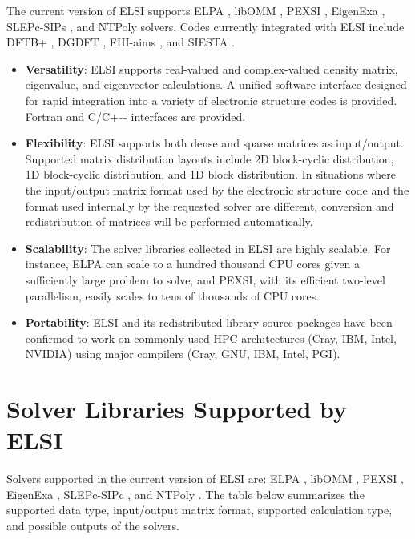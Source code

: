 \documentclass{report}
\begin{document}
The current version of ELSI supports ELPA \cite{elpa_auckenthaler_2011,elpa_marek_2014}, libOMM \cite{libomm_corsetti_2014}, PEXSI \cite{pexsi_lin_2009,pexsi_lin_2013}, EigenExa \cite{eigenexa_imamura_2011,eigenexa_fukaya_2015}, SLEPc-SIPs \cite{slepc_hernandez_2005,sips_keceli_2016}, and NTPoly \cite{ntpoly_dawson_2018} solvers. Codes currently integrated with ELSI include DFTB+ \cite{dftb+_aradi_2007}, DGDFT \cite{dgdft_hu_2015}, FHI-aims \cite{aims_blum_2009}, and SIESTA \cite{siesta_soler_2002}.

\begin{itemize}
\item \textbf{Versatility}: ELSI supports real-valued and complex-valued density matrix, eigenvalue, and eigenvector calculations. A unified software interface designed for rapid integration into a variety of electronic structure codes is provided. Fortran and C/C++ interfaces are provided.

\item \textbf{Flexibility}: ELSI supports both dense and sparse matrices as input/output. Supported matrix distribution layouts include 2D block-cyclic distribution, 1D block-cyclic distribution, and 1D block distribution. In situations where the input/output matrix format used by the electronic structure code and the format used internally by the requested solver are different, conversion and redistribution of matrices will be performed automatically.

\item \textbf{Scalability}: The solver libraries collected in ELSI are highly scalable. For instance, ELPA can scale to a hundred thousand CPU cores given a sufficiently large problem to solve, and PEXSI, with its efficient two-level parallelism, easily scales to tens of thousands of CPU cores.

\item \textbf{Portability}: ELSI and its redistributed library source packages have been confirmed to work on commonly-used HPC architectures (Cray, IBM, Intel, NVIDIA) using major compilers (Cray, GNU, IBM, Intel, PGI).
\end{itemize}

\section{Solver Libraries Supported by ELSI}
\label{sec:solvers}
Solvers supported in the current version of ELSI are: ELPA \cite{elpa_auckenthaler_2011,elpa_marek_2014}, libOMM \cite{libomm_corsetti_2014}, PEXSI \cite{pexsi_lin_2009,pexsi_lin_2013}, EigenExa \cite{eigenexa_imamura_2011,eigenexa_fukaya_2015}, SLEPc-SIPc \cite{slepc_hernandez_2005,sips_keceli_2016}, and NTPoly \cite{ntpoly_dawson_2018}. The table below summarizes the supported data type, input/output matrix format, supported calculation type, and possible outputs of the solvers.
\end{document}
